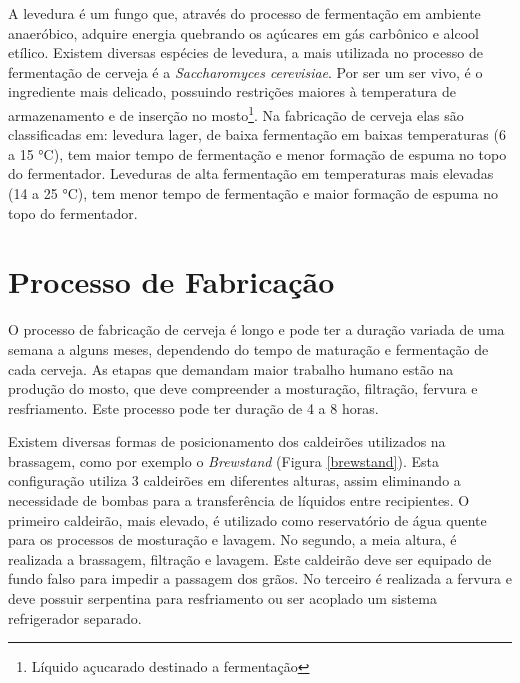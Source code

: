 A levedura é um fungo que, através do processo de fermentação em ambiente anaeróbico, adquire energia quebrando os açúcares em gás carbônico e alcool etílico. Existem diversas espécies de levedura, a mais utilizada no processo de fermentação de cerveja é a \textit{Saccharomyces cerevisiae}. Por ser um ser vivo, é o ingrediente mais delicado, possuindo restrições maiores à temperatura de armazenamento e de inserção no mosto\footnote{Líquido açucarado destinado a fermentação}. Na fabricação de cerveja elas são classificadas em: levedura lager, de baixa fermentação em baixas temperaturas (6 a 15 °C), tem maior tempo de fermentação e menor formação de espuma no topo do fermentador. Leveduras de alta fermentação em temperaturas mais elevadas (14 a 25 °C), tem menor tempo de fermentação e maior formação de espuma no topo do fermentador.



		\section{Processo de Fabricação}
O processo de fabricação de cerveja é longo e pode ter a duração variada de uma semana a alguns meses, dependendo do tempo de maturação e fermentação de cada cerveja. As etapas que demandam maior trabalho humano estão na produção do mosto, que deve compreender a mosturação, filtração, fervura e resfriamento. Este processo pode ter duração de 4 a 8 horas. 

Existem diversas formas de posicionamento dos caldeirões utilizados na brassagem, como por exemplo o \textit{Brewstand} (Figura \ref{brewstand}). Esta configuração utiliza 3 caldeirões em diferentes alturas, assim eliminando a necessidade de bombas para a transferência de líquidos entre recipientes. O primeiro caldeirão, mais elevado, é utilizado como reservatório de água quente para os processos de mosturação e lavagem. No segundo, a meia altura, é realizada a brassagem, filtração e lavagem. Este caldeirão deve ser equipado de fundo falso para impedir a passagem dos grãos. No terceiro é realizada a fervura e deve possuir serpentina para resfriamento ou ser acoplado um sistema refrigerador separado.   

